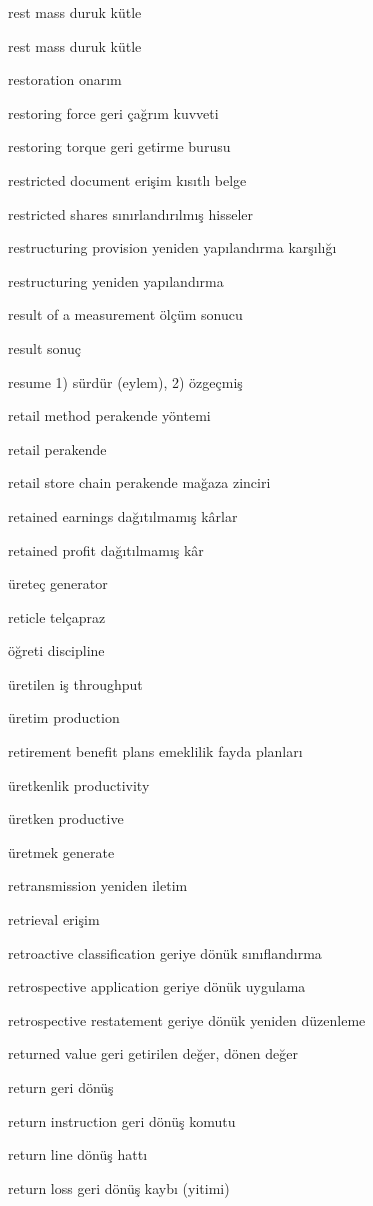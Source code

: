 \documentclass[12pt,fleqn]{article}\usepackage{../../common}
\begin{document}
rest mass duruk kütle

rest mass duruk kütle

restoration onarım

restoring force geri çağrım kuvveti

restoring torque geri getirme burusu

restricted document erişim kısıtlı belge

restricted shares sınırlandırılmış hisseler

restructuring provision yeniden yapılandırma karşılığı

restructuring yeniden yapılandırma

result of a measurement ölçüm sonucu

result sonuç

resume 1) sürdür (eylem), 2) özgeçmiş

retail method perakende yöntemi

retail perakende

retail store chain perakende mağaza zinciri

retained earnings dağıtılmamış kârlar

retained profit dağıtılmamış kâr

üreteç generator

reticle telçapraz

öğreti discipline

üretilen iş throughput

üretim production

retirement benefit plans emeklilik fayda planları

üretkenlik productivity

üretken productive

üretmek generate

retransmission yeniden iletim

retrieval erişim

retroactive classification geriye dönük sınıflandırma

retrospective application geriye dönük uygulama

retrospective restatement geriye dönük yeniden düzenleme 

returned value geri getirilen değer, dönen değer

return geri dönüş

return instruction geri dönüş komutu

return line dönüş hattı

return loss geri dönüş kaybı (yitimi)
\end{document}
